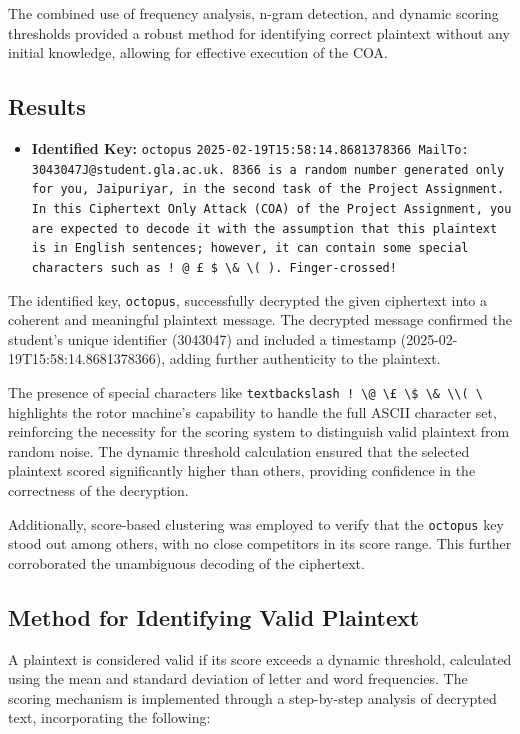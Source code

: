 \documentclass{article}
\begin{document}
The combined use of frequency analysis, n-gram detection, and dynamic scoring thresholds provided a robust method for identifying correct plaintext without any initial knowledge, allowing for effective execution of the COA.


\subsection{Results}
\begin{itemize}
    \item \textbf{Identified Key:}  \texttt{octopus}
    \texttt{2025-02-19T15:58:14.8681378366 MailTo: 3043047J@student.gla.ac.uk. 8366 is a random number generated only for you, Jaipuriyar, in the second task of the Project Assignment. In this Ciphertext Only Attack (COA) of the Project Assignment, you are expected to decode it with the assumption that this plaintext is in English sentences; however, it can contain some special characters such as  !  @  £  \$ \textbackslash \& \textbackslash *  (  ). Finger-crossed!}
\end{itemize}
The identified key, \texttt{octopus}, successfully decrypted the given ciphertext into a coherent and meaningful plaintext message. The decrypted message confirmed the student's unique identifier (3043047) and included a timestamp (2025-02-19T15:58:14.8681378366), adding further authenticity to the plaintext.

The presence of special characters like \texttt{textbackslash ! \textbackslash @ \textbackslash £ \textbackslash \$ \textbackslash \& \textbackslash * \textbackslash ( \textbackslash } highlights the rotor machine's capability to handle the full ASCII character set, reinforcing the necessity for the scoring system to distinguish valid plaintext from random noise. The dynamic threshold calculation ensured that the selected plaintext scored significantly higher than others, providing confidence in the correctness of the decryption.

Additionally, score-based clustering was employed to verify that the \texttt{octopus} key stood out among others, with no close competitors in its score range. This further corroborated the unambiguous decoding of the ciphertext.


\subsection{Method for Identifying Valid Plaintext}

A plaintext is considered valid if its score exceeds a dynamic threshold, calculated using the mean and standard deviation of letter and word frequencies. The scoring mechanism is implemented through a step-by-step analysis of decrypted text, incorporating the following:
\end{document}
